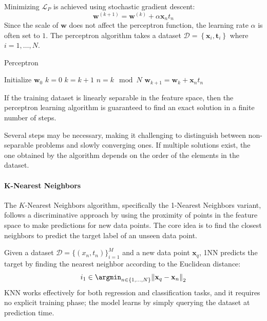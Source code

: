 Minimizing $\mathcal{L}_P$ is achieved using stochastic gradient descent:
\[\textbf{w}^{(k+1)}=\textbf{w}^{(k)}+\alpha\textbf{x}_nt_n\]
Since the scale of $\textbf{w}$ does not affect the perceptron function, the learning rate $\alpha$ is often set to $1$. 
The perceptron algorithm takes a dataset $\mathcal{D}=\left\{ \textbf{x}_i,\textbf{t}_i  \right\}$ where $i=1,\dots,N$. 
\begin{algorithm}[H]
    \caption{Perceptron}
        \begin{algorithmic}[1]
            \State Initialize $\textbf{w}_0$
            \State $k = 0$
            \Repeat
                \State $k = k+1$
                \State $n = k \mod N$
                    \State $\textbf{w}_{k+1} = \textbf{w}_k + \textbf{x}_nt_n$
                \EndIf
        \end{algorithmic}
\end{algorithm}
\begin{theorem}
    If the training dataset is linearly separable in the feature space, then the perceptron learning algorithm is guaranteed to find an exact solution in a finite number of steps.
\end{theorem}
Several steps may be necessary, making it challenging to distinguish between non-separable problems and slowly converging ones. 
If multiple solutions exist, the one obtained by the algorithm depends on the order of the elements in the dataset.

\paragraph*{K-Nearest Neighbors}
The $K$-Nearest Neighbors algorithm, specifically the 1-Nearest Neighbors variant, follows a discriminative approach by using the proximity of points in the feature space to make predictions for new data points. 
The core idea is to find the closest neighbors to predict the target label of an unseen data point.

Given a dataset $\mathcal{D}=\{(x_n,t_n)\}_{i=1}^M$ and a new data point $\mathbf{x}_q$, 1NN predicts the target by finding the nearest neighbor according to the Euclidean distance:
\[i_1\in\argmin_{n\in\{1,\dots,N\}}{\left\lVert \mathbf{x}_q- \mathbf{x}_n\right\rVert}_2 \]
KNN works effectively for both regression and classification tasks, and it requires no explicit training phase; the model learns by simply querying the dataset at prediction time.

